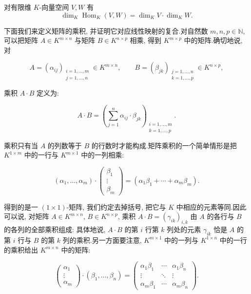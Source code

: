\begin{corollary}\label{cor:3.1.5}
对有限维 $K$-向量空间 $V, W$ 有
\[
\dim_K \operatorname{Hom}_K(V, W) = \dim_K V \cdot \dim_K W\text{.}
\]
\end{corollary}

下面我们来定义矩阵的乘积, 并证明它对应线性映射的复合.对自然数 $m, n, p \in \mathbb{N}$, 可以把矩阵 $A \in K^{m \times n}$ 与矩阵 $B \in K^{n \times p}$ 相乘, 得到 $K^{m \times p}$ 中的矩阵.确切地说, 对

\[
A = (\alpha_{ij})_{\substack{i = 1, \ldots, m\\ j = 1, \ldots, n}} \in K^{m \times n}, \qquad
B = (\beta_{jk})_{\substack{j = 1, \ldots, n\\ k = 1, \ldots, p}} \in K^{n \times p},
\]

乘积 $A \cdot B$ 定义为:

\[
A \cdot B = \left(\sum_{j = 1}^{n}\alpha_{ij} \cdot \beta_{jk}\right)_{\substack{i = 1, \ldots, m\\ k = 1, \ldots, p}}\text{.}
\]

乘积只有当 $A$ 的列数等于 $B$ 的行数时才能构成.矩阵乘积的一个简单情形是把 $K^{1 \times m}$ 中的一行与 $K^{m \times 1}$ 中的一列相乘:

\[
(\alpha_1, \ldots, \alpha_m) \cdot
\begin{pmatrix} \beta_1 \\ \vdots \\ \beta_m \end{pmatrix}
= (\alpha_1\beta_1 + \cdots + \alpha_m\beta_m)\text{.}
\]

得到的是一 $(1 \times 1)$-矩阵, 我们约定去掉括号, 把它与 $K$ 中相应的元素等同.因此可以说, 对矩阵 $A \in K^{m \times n}$, $B \in K^{n \times p}$, 乘积 $A \cdot B = (\gamma_{ik})_{i, k}$ 由 $A$ 的各行与 $B$ 的各列的全部乘积组成: 具体地说, $A \cdot B$ 的第 $i$ 行第 $k$ 列处的元素 $\gamma_{ik}$ 恰是 $A$ 的第 $i$ 行与 $B$ 的第 $k$ 列的乘积.另一方面要注意, $K^{m \times 1}$ 中的一列与 $K^{1 \times n}$ 中的一行的乘积给出 $K^{m \times n}$ 中的矩阵:

\[
\begin{pmatrix} \alpha_1 \\ \vdots \\ \alpha_m \end{pmatrix}
\cdot
(\beta_1, \ldots, \beta_n)
=
\begin{pmatrix}
\alpha_1\beta_1 & \cdots & \alpha_1\beta_n \\
\vdots & \ddots & \vdots \\
\alpha_m\beta_1 & \cdots & \alpha_m\beta_n
\end{pmatrix}\text{.}
\]

